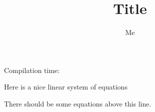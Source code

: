 \documentclass{simple-article}
\author{Me}
\title{Title}
\begin{document}
\maketitle
Compilation time: \DTMcurrenttime

Here is a nice linear system of equations


There should be some equations above this line.
\end{document}
